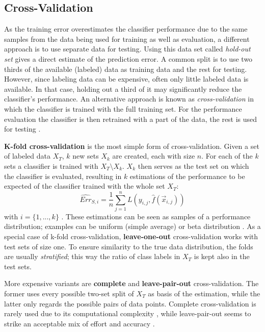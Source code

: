 \subsection{Cross-Validation}
As the training error overestimates the classifier performance due to the same samples from the data being used for training as well as evaluation, a different approach is to use separate data for testing. Using this data set called \textit{hold-out set} gives a direct estimate of the prediction error. A common split is to use two thirds of the available (labeled) data as training data and the rest for testing. However, since labeling data can be expensive, often only little labeled data is available. In that case, holding out a third of it may significantly reduce the classifier's performance. An alternative approach is known as \textit{cross-validation} in which the classifier is trained with the full training set. For the performance evaluation the classifier is then retrained with a part of the data, the rest is used for testing \cite{Kohavi1995}.

\textbf{K-fold cross-validation} is the most simple form of cross-validation. Given a set of labeled data $X_T$, $k$ new sets $X_k$ are created, each with size $n$. For each of the $k$ sets a classifier is trained with $X_T \setminus X_k$. $X_k$ then serves as the test set on which the classifier is evaluated, resulting in $k$ estimations of the performance to be expected of the classifier trained with the whole set $X_T$:
\begin{equation}
\widehat{Err}_{S,i} = \frac{1}{n} \sum_{j=1}^{n} L(y_{i, j}, \hat{f}(\vec{x}_{i, j}))
\end{equation}
with $i = \{1, ..., k\}$ \cite{Kohavi1995}. These estimations can be seen as samples of a performance distribution; examples can be uniform (simple average) or beta distribution \cite{KremplEtAl2014}. As a special case of k-fold cross-validation, \textbf{leave-one-out} cross-validation works with test sets of size one. To ensure similarity to the true data distribution, the folds are usually \textit{stratified}; this way the ratio of class labels in $X_T$ is kept also in the test sets.

More expensive variants are \textbf{complete} and \textbf{leave-pair-out} cross-validation. The former uses every possible two-set split of $X_T$ as basis of the estimation, while the latter only regards the possible pairs of data points. Complete cross-validation is rarely used due to its computational complexity \cite{Kohavi1995}, while leave-pair-out seems to strike an acceptable mix of effort and accuracy \cite{PahikkalaEtAl2008}.

